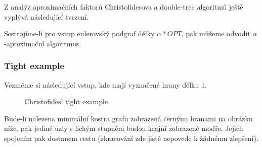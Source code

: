 \documentclass[
  biblatex,
  figures=false,
  glossaries,
  index
]{kidiplom}
\begin{document}
	
	Z analýz aproximačních faktorů Christofidesova a double-tree algoritmů ještě vyplývá následující tvrzení.
\begin{lemma}
Sestrojíme-li pro vstup eulerovský podgraf délky $\alpha*OPT$, pak můžeme odvodit $\alpha$-aproximační algoritmus.
\end{lemma}

\subsubsection{Tight example}
Vezměme si následující vstup, kde mají vyznačené hrany délku 1.

\begin{figure}[H]
    \begin{center}
    \end{center}
    \caption{Christofides' tight example}
\end{figure}

Bude-li nalezena minimální kostra grafu zobrazená černými hranami na obrázku níže, pak jediné uzly s lichým stupněm budou krajní zobrazené modře. Jejich spojením pak dostanem cestu (zkracování zde jistě nepovede k žádnému zlepšení).
\end{document}
